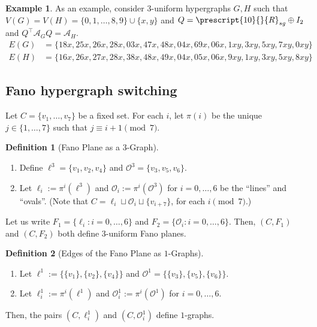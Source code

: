 \documentclass[12pt]{article}
\numberwithin{equation}{section}
\theoremstyle{definition}
\newtheorem{definition}{Definition}
\newtheorem{example}{Example}
\newcommand{\ev}[1]{( #1 )}
\begin{document}
\begin{example}
As an example, consider $3$-uniform hypergraphs $G,H$ such that $V\ev{G} = V\ev{H} = \{ 0, 1,\ldots, 8, 9\}\cup \{x,y\}$ and $Q = \prescript{10}{}{R}_{sg} \oplus I_2$ and $Q^\top \mathcal{A}_G Q = \mathcal{A}_H$.
\begin{align*}
E\ev{G} & = \{ 18x, 25x, 26x, 28x, 03x, 47x, 48x, 04x, 69x, 06x, 1xy, 3xy, 5xy, 7xy, 0xy \} \\
E\ev{H} & = \{ 16x, 26x, 27x, 28x, 38x, 48x, 49x, 04x, 05x, 06x, 9xy, 1xy, 3xy, 5xy, 8xy \}
\end{align*}
\end{example}


\subsection{Fano hypergraph switching}

Let $C=\{ v_1, \ldots, v_7 \}$ be a fixed set. For each $i$, let $\pi \ev{ i }$ be the unique $j \in \{ 1, \ldots, 7\}$ such that $j \equiv i+1 \pmod{7} $.
\begin{definition}[Fano Plane as a 3-Graph]\leavevmode

\begin{enumerate}
\item Define $\ell^3 = \{ v_1, v_2, v_4 \}$ and $\mathcal{O}^3 = \{ v_3, v_5, v_6 \}$. 
\item Let $\ell_i := \pi^{i} \ev{ \ell^3 }$ and $\mathcal{O}_i := \pi^{i} \ev{ \mathcal{O}^3 }$ for $i=0,\ldots,6$  be the ``lines'' and ``ovals''. (Note that $C = \ell_i \sqcup \mathcal{O}_{i} \sqcup \{ v_{i+7} \}$, for each $i \pmod{7}$.)
\end{enumerate} 
\end{definition}
Let us write $ F_1 = \{\ell_i: i = 0,\ldots,6 \} $ and $F_2 = \{ \mathcal{O}_i : i = 0,\ldots,6 \}$. Then, $\ev{C, F_1}$ and $\ev{C, F_2}$ both define $3$-uniform Fano planes.

\begin{definition}[Edges of the Fano Plane as $1$-Graphs]\leavevmode
\begin{enumerate}
\item Let $\ell^1 := \{ \{v_1\},\{v_2\},\{v_4\} \}$ and $\mathcal{O}^1 = \{  \{v_3\},\{v_5\},\{v_6\} \}$.
\item Let $\ell_i^1 := \pi^{i} \ev{ \ell^1 }$ and $\mathcal{O}_i^1 := \pi^{i} \ev{ \mathcal{O}^1 }$ for $i=0,\ldots,6$. 
\end{enumerate} 
Then, the pairs $\ev{C, \ell_i^1}$ and  $\ev{C, \mathcal{O}_i^1}$ define $1$-graphs. 
\end{definition}
\end{document}
